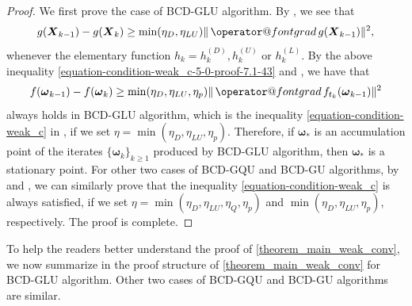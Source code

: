\documentclass[final,onefignum,onetabnum]{siamart190516}
\makeatletter
\newcommand{\matr}[1]{\boldsymbol{#1}}
\newcommand{\ProjGrad}[2]{\mathop{{\operator@font grad} }#1(#2)}
\makeatother
\begin{document}
\begin{proof}
We first prove the case of BCD-GLU algorithm. 
By , we see that  
\begin{equation}\label{equation-condition-weak_c-5-0-proof-7.1-43}
g(\matr{X}_{k-1})-g(\matr{X}_{k})\geq\min(\eta_{D},\eta_{LU})\|\ProjGrad{g}{\matr{X}_{k-1}}\|^2,
\end{equation}
whenever the elementary function $h_k=h^{(D)}_{k}, h^{(U)}_{k}$ or $h^{(L)}_k$. 
By the above inequality \cref{equation-condition-weak_c-5-0-proof-7.1-43} and , we have that 
\begin{equation}\label{eq:sufficient_descent-2-proof-6.11-32}
f(\matr{\omega}_{k-1})-f(\matr{\omega}_{k})\geq\min(\eta_{D},\eta_{LU},\eta_{p})\|\ProjGrad{f_{t_k}}{\matr{\omega}_{k-1}}\|^2
\end{equation}
always holds in BCD-GLU algorithm, which is the inequality \cref{equation-condition-weak_c} in , if we set $\eta=\min(\eta_{D},\eta_{LU},\eta_{p})$.
Therefore, if $\matr{\omega}_*$ is an accumulation point of the iterates $\{\matr{\omega}_k\}_{k\geq 1}$ produced by BCD-GLU algorithm,
then $\matr{\omega}_*$ is a stationary point. 
For other two cases of BCD-GQU and BCD-GU algorithms, by  and ,
we can similarly prove that the inequality \cref{equation-condition-weak_c} is always satisfied, if we set $\eta=\min(\eta_{D},\eta_{LU},\eta_{Q},\eta_{p})$ and $\min(\eta_{D},\eta_{LU},\eta_{p})$, respectively.  
The proof is complete. 
\end{proof}

To help the readers better understand the proof of \cref{theorem_main_weak_conv}, we now summarize in  the proof structure of \cref{theorem_main_weak_conv} for BCD-GLU algorithm. Other two cases of BCD-GQU and BCD-GU algorithms are similar. 
\end{document}

